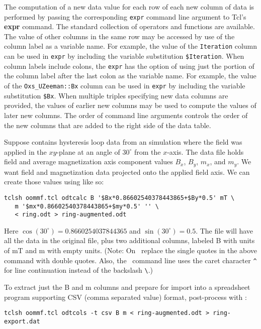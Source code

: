 The computation of a new data value for each row of each new column
of data is performed by passing the corresponding {\tt expr} command
line argument to Tcl's {\bf expr} command.  The standard collection
of operators and functions are available.  The value of other columns
in the same row may be accessed by use of the column label as a variable
name.  For example, the value of the {\tt Iteration} column can be used
in {\tt expr} by including the variable substitution {\tt \$Iteration}.
When column labels include colons, the {\tt expr} has the option of using
just the portion of the column label after the last colon as the variable
name.  For example, the value of the {\tt Oxs\_UZeeman::Bx} column can
be used in {\tt expr} by including the variable substitution {\tt \$Bx}.
When multiple triples specifying new data columns are provided, the
values of earlier new columns may be used to compute the values of later
new columns.  The order of command line arguments controls the order of
the new columns that are added to the right side of the data table.

Suppose  contains hysteresis loop data from an 
simulation where the field was applied in the $xy$-plane at an angle of
$30^\circ$ from the $x$-axis.  The data file holds field and average
magnetization axis component values $B_x$, $B_y$, $m_x$, and $m_y$.  We
want field and magnetization data projected onto the applied field
axis.  We can create those values using  like so:
\begin{verbatim}
tclsh oommf.tcl odtcalc B '$Bx*0.86602540378443865+$By*0.5' mT \
   m '$mx*0.86602540378443865+$my*0.5' '' \
   < ring.odt > ring-augmented.odt
\end{verbatim}
Here $\cos(30^\circ)=0.8660254037844365$ and $\sin(30^\circ)=0.5$.  The
 file will have all the data in the original
\fn{ring.odt} file, plus two additional columns, labeled B with
units of mT and m with empty units.  (Note: On \Windows\ replace the
single quotes in the above command with double quotes.  Also, the
\Windows\ command line uses the caret character \verb+^+ for line
continuation instead of the backslash \verb+\+.)

To extract just the B and m columns and prepare for import into a
spreadsheet program supporting CSV (comma separated value) format,
post-process with \app{odtcols}:
\begin{verbatim}
tclsh oommf.tcl odtcols -t csv B m < ring-augmented.odt > ring-export.dat
\end{verbatim}


